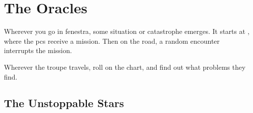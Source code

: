 \chapter{The Oracles}
\label{encounters}

Wherever you go in \gls{fenestra}, some situation or catastrophe emerges.
It starts at , where the \glspl{pc} receive a mission.
Then on the road, a random encounter interrupts the mission.

Wherever the troupe travels, roll on the chart, and find out what problems they find.

\section{The Unstoppable Stars}

\label{astronomy}
\label{seasons}


